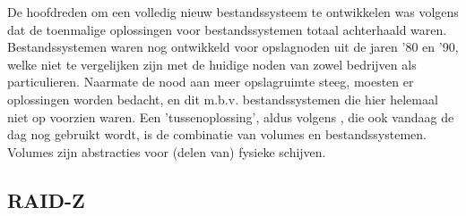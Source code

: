 De hoofdreden om een volledig nieuw bestandssysteem te ontwikkelen was volgens \textcite{JeffBonwick_lastZFS} dat de toenmalige oplossingen voor bestandssystemen totaal achterhaald waren. Bestandssystemen waren nog ontwikkeld voor opslagnoden uit de jaren '80 en '90, welke niet te vergelijken zijn met de huidige noden van zowel bedrijven als particulieren. Naarmate de nood aan meer opslagruimte steeg, moesten er oplossingen worden bedacht, en dit m.b.v. bestandssystemen die hier helemaal niet op voorzien waren. Een 'tussenoplossing', aldus volgens \textcite{JeffBonwick_lastZFS}, die ook vandaag de dag nog gebruikt wordt, is de combinatie van volumes en bestandssystemen. Volumes zijn abstracties voor (delen van) fysieke schijven.



\subsection{RAID-Z}

